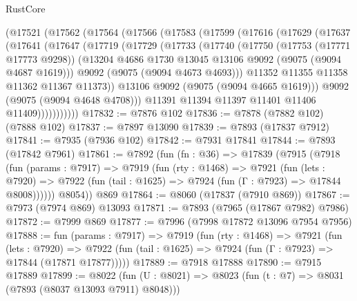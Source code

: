 \begin{lexlean}{RustCore}
\begin{coremodule}
    (@17521
      (@17562
        (@17564
          (@17566
            (@17583
              (@17599
                (@17616
                  (@17629
                    (@17637
                      (@17641
                        (@17647
                          (@17719
                            (@17729
                              (@17733
                                (@17740
                                  (@17750
                                    (@17753 (@17771 @17773 @9298))
                                    (@13204
                                      @4686
                                      @1730
                                      @13045
                                      @13106
                                      @9092
                                      (@9075 (@9094 @4687 @1619)))
                                    @9092
                                    (@9075 (@9094 @4673 @4693)))
                                  @11352
                                  @11355
                                  @11358
                                  @11362
                                  @11367
                                  @11373))
                              @13106
                              @9092
                              (@9075 (@9094 @4665 @1619)))
                            @9092
                            (@9075 (@9094 @4648 @4708)))
                          @11391
                          @11394
                          @11397
                          @11401
                          @11406
                          @11409)))))))))))
@17832 := @7876 @102
@17836 := @7878 (@7882 @102) (@7888 @102)
@17837 := @7897 @13090
@17839 := @7893 (@17837 @7912)
@17841 := @7935 (@7936 @102)
@17842 := @7931 @17841
@17844 := @7893 (@17842 @7961)
@17861 := @7892
    (fun (fn : @36) =>
    @17839
      (@7915
        (@7918
          (fun (params : @7917) =>
          @7919
            (fun (rty : @1468) =>
            @7921
              (fun (lets : @7920) =>
              @7922 (fun (tail : @1625) => @7924 (fun (Γ : @7923) => @17844 @8008))))))
        @8054))
    @869
@17864 := @8060 (@17837 (@7910 @869))
@17867 := @7973 (@7974 @869) @13093
@17871 := @7893 (@7965 (@17867 @7982) @7986)
@17872 := @7999 @869
@17877 := @7996 (@7998 @17872 @13096 @7954 @7956)
@17888 := fun (params : @7917) =>
  @7919
    (fun (rty : @1468) =>
    @7921
      (fun (lets : @7920) =>
      @7922 (fun (tail : @1625) => @7924 (fun (Γ : @7923) => @17844 (@17871 @17877)))))
@17889 := @7918 @17888
@17890 := @7915 @17889
@17899 := @8022
    (fun (U : @8021) => @8023 (fun (t : @7) => @8031 (@7893 (@8037 @13093 @7911) @8048)))

\end{coremodule}
\end{lexlean}
